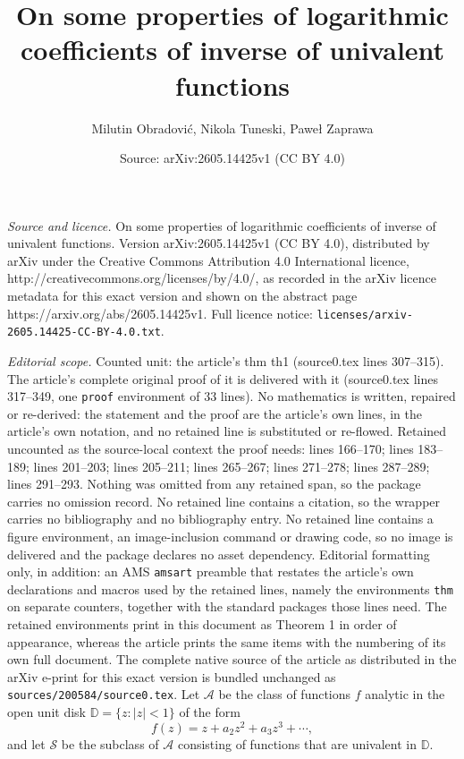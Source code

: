 \documentclass[10pt,a4paper]{amsart}
\title{On some properties of logarithmic coefficients of inverse of univalent functions}
\author{Milutin Obradovi\'c, Nikola Tuneski, Pawe{\l} Zaprawa}
\date{Source: arXiv:2605.14425v1 (CC BY 4.0)}
\newcommand{\D}{{\mathbb D}}
\def\be{\begin{equation}}
\def\ee{\end{equation}}
\begin{document}
\maketitle

\noindent\emph{Source and licence.} On some properties of logarithmic coefficients of inverse of univalent functions. Version arXiv:2605.14425v1 (CC BY 4.0), distributed by arXiv under the Creative Commons Attribution 4.0 International licence, http://creativecommons.org/licenses/by/4.0/, as recorded in the arXiv licence metadata for this exact version and shown on the abstract page https://arxiv.org/abs/2605.14425v1. Full licence notice: \texttt{licenses/arxiv-2605.14425-CC-BY-4.0.txt}.\par\smallskip

\noindent\textit{Editorial scope.} Counted unit: the article's thm th1 (source0.tex lines 307--315). The article's complete original proof of it is delivered with it (source0.tex lines 317--349, one \texttt{proof} environment of 33 lines). No mathematics is written, repaired or re-derived: the statement and the proof are the article's own lines, in the article's own notation, and no retained line is substituted or re-flowed.  Retained uncounted as the source-local context the proof needs: lines 166--170; lines 183--189; lines 201--203; lines 205--211; lines 265--267; lines 271--278; lines 287--289; lines 291--293.  Nothing was omitted from any retained span, so the package carries no omission record.  No retained line contains a citation, so the wrapper carries no bibliography and no bibliography entry.  No retained line contains a figure environment, an image-inclusion command or drawing code, so no image is delivered and the package declares no asset dependency.  Editorial formatting only, in addition: an AMS \texttt{amsart} preamble that restates the article's own declarations and macros used by the retained lines, namely the environments \texttt{thm} on separate counters, together with the standard packages those lines need.  The retained environments print in this document as Theorem 1 in order of appearance, whereas the article prints the same items with the numbering of its own full document.  The complete native source of the article as distributed in the arXiv e-print for this exact version is bundled unchanged as \texttt{sources/200584/source0.tex}.
Let $\mathcal{A}$ be the class of functions $f$ analytic in the open unit disk $\D=\{z:|z|<1\}$ of the form
\be\label{eq-1}
f(z)=z+a_2z^2+a_3z^3+\cdots,
\ee
and let $\mathcal{S}$ be the subclass of $\mathcal{A}$ consisting of functions that are univalent in $\D$.
\end{document}
